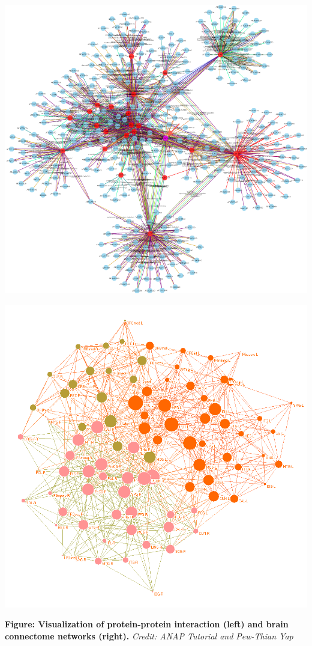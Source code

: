 
	\begin{minipage}{0.5\linewidth}
		\centering
		\includegraphics[width=0.5\linewidth]{images/anap11.png}
	\end{minipage}
	\begin{minipage}{0.5\linewidth}
		\centering
		\includegraphics[width=0.5\linewidth,trim={0 0.5in 0 0}]{images/connectome.png}
	\end{minipage}

\begin{center}
	{\small
	\textbf{Figure:  Visualization of protein-protein interaction (left) and brain connectome networks (right).} \textit{Credit:  ANAP Tutorial and Pew-Thian Yap}}
\end{center}
